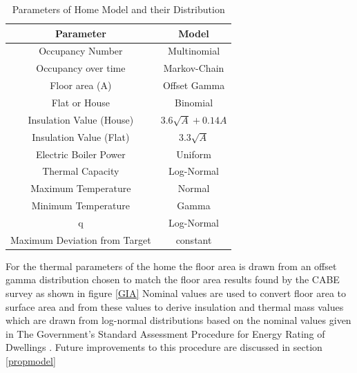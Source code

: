 \documentclass[a4paper, 10 pt, conference]{ieeeconf}  %
\begin{document}
\begin{table}[h]
\caption{Parameters of Home Model and their Distribution}
\label{modelpara}
\begin{center}
\begin{tabular}{|c||c|}
\hline
Parameter & Model\\
\hline \hline
Occupancy Number & Multinomial \\
\hline
Occupancy over time & Markov-Chain \\
\hline
Floor area (A) & Offset Gamma \\
\hline
Flat or House & Binomial  \\
\hline
Insulation Value (House) & $3.6\sqrt{A}+0.14A$\\
\hline
Insulation Value (Flat) & $3.3\sqrt{A}$\\
\hline
Electric Boiler Power & Uniform\\
\hline
Thermal Capacity & Log-Normal  \\
\hline
Maximum Temperature & Normal \\
\hline
Minimum Temperature & Gamma \\
\hline
q & Log-Normal \\
\hline
Maximum Deviation from Target & constant \\
\hline
\end{tabular}
\end{center}
\end{table}

For the thermal parameters of the home the floor area is drawn from an offset gamma distribution chosen to match the floor area results found by the CABE survey as shown in figure \ref{GIA} Nominal values are used to convert floor area to surface area and from these values to derive insulation and thermal mass values which are drawn from log-normal distributions based on the nominal values given in The Government’s Standard Assessment Procedure for Energy Rating of Dwellings \cite{SAP}. Future improvements to this procedure are discussed in section \ref{propmodel}
\end{document}
